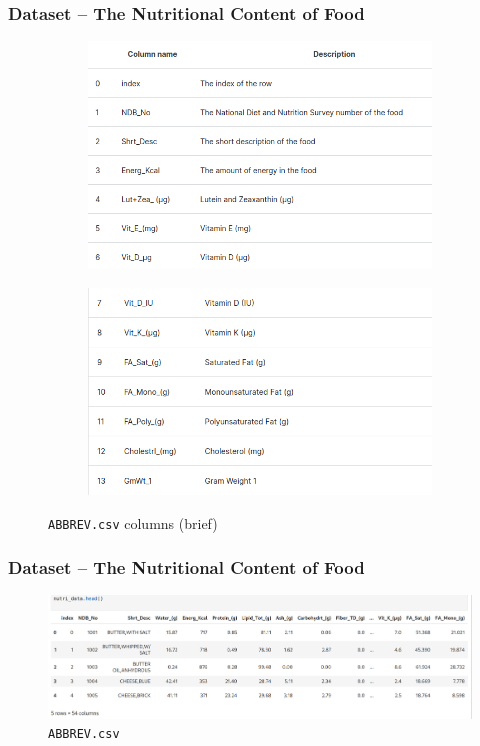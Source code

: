 \documentclass{beamer}
\begin{document}
\begin{frame}
	\frametitle{Dataset -- The Nutritional Content of Food}
	\begin{figure}[H]
		\centering
		\begin{subfigure}[b]{0.48\linewidth}
			\includegraphics[width=\linewidth]{img/nutri_columns1.png}
		\end{subfigure}
		\begin{subfigure}[b]{0.48\linewidth}
			\includegraphics[width=\linewidth]{img/nutri_columns2.png}
		\end{subfigure}
		\caption{\texttt{ABBREV.csv} columns (brief)}
	\end{figure}
\end{frame}

\begin{frame}
	\frametitle{Dataset -- The Nutritional Content of Food}
	\begin{figure}[H]
		\centering
		\includegraphics[width=\linewidth]{img/nutri_head.png}
		\caption{\texttt{ABBREV.csv}}
	\end{figure}
\end{frame}

\end{document}
